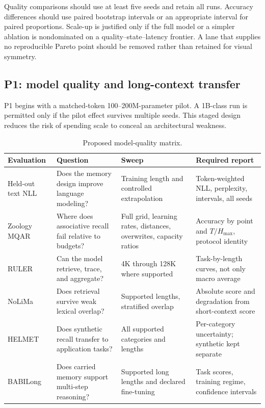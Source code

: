 Quality comparisons should use at least five seeds and retain all runs.
Accuracy differences should use paired bootstrap intervals or an appropriate
interval for paired proportions. Scale-up is justified only if the full model
or a simpler ablation is nondominated on a quality--state--latency frontier. A
lane that supplies no reproducible Pareto point should be removed rather than
retained for visual symmetry.

\subsection{P1: model quality and long-context transfer}

P1 begins with a matched-token 100--200M-parameter pilot. A 1B-class run is
permitted only if the pilot effect survives multiple seeds. This staged design
reduces the risk of spending scale to conceal an architectural weakness.

\begin{table}[p]
\centering
\small
\caption{Proposed model-quality matrix.}
\label{tab:quality-matrix}
\begin{tabularx}{\textwidth}{@{}p{}p{}
  p{}X@{}}
\toprule
Evaluation & Question & Sweep & Required report \\
\midrule
Held-out text NLL &
Does the memory design improve language modeling? &
Training length and controlled extrapolation &
Token-weighted NLL, perplexity, intervals, all seeds \\
Zoology MQAR &
Where does associative recall fail relative to budgets? &
Full grid, learning rates, distances, overwrites, capacity ratios &
Accuracy by point and \(T/H_{\max}\), protocol identity \\
RULER \citep{hsieh2024ruler} &
Can the model retrieve, trace, and aggregate? &
4K through 128K where supported &
Task-by-length curves, not only macro average \\
NoLiMa \citep{modarressi2025nolima} &
Does retrieval survive weak lexical overlap? &
Supported lengths, stratified overlap &
Absolute score and degradation from short-context score \\
HELMET \citep{yen2025helmet} &
Does synthetic recall transfer to application tasks? &
All supported categories and lengths &
Per-category uncertainty; synthetic kept separate \\
BABILong \citep{kuratov2024babilong} &
Does carried memory support multi-step reasoning? &
Supported long lengths and declared fine-tuning &
Task scores, training regime, confidence intervals \\
\bottomrule
\end{tabularx}
\end{table}


